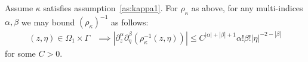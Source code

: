 \documentclass[
	fontsize=11pt, 
	twoside=false, 
	abstract=true, 
	a4paper,
]{scrartcl}
\newcommand{\abs}[1]{\left\lvert#1\right\rvert}
\newcommand{\del}{\partial}
\begin{document}
\begin{lemma}\label{lemm:boundonrho}
	Assume $\kappa$ satisfies assumption~\ref{as:kappa1}. For $\rho_\kappa$ as above, for any multi-indices $\alpha,\beta$ %
	we may bound $(\rho_\kappa)^{-1}$ as follows: 
	\begin{align*}
		(z,\eta) \in \Omega_1\times\Gamma &\implies \abs{\del^\alpha_{z}\del^\beta_{\eta}\left(\rho_\kappa^{-1}(z,\eta)\right)} \leq C^{\abs{\alpha}+\abs{\beta}+1}\alpha!\beta!\abs{\eta}^{-2-\abs{\beta}} 
	\end{align*}
	for some $C>0$.
\end{lemma}
%
\end{document}
